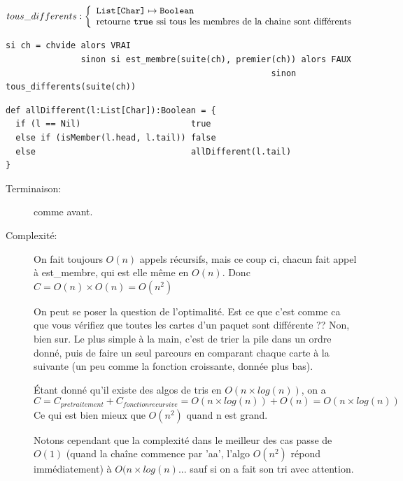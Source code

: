 \documentclass[10pt]{article}\usepackage[correction,nu]{esial}
\begin{document}
\begin{Question}
  $tous\_differents: \left\{
    \begin{array}{l}
      \text{\texttt{List[Char]}}\mapsto \text{\texttt{Boolean}}\\
      \text{retourne \text{\texttt{true}} ssi tous les membres de la chaine sont différents}
    \end{array}\right.$  
\end{Question}
\begin{Reponse}
  \begin{Verbatim}[label=tous\_differents(ch)]
si ch = chvide alors VRAI
               sinon si est_membre(suite(ch), premier(ch)) alors FAUX
                                                     sinon tous_differents(suite(ch))    
  \end{Verbatim}
  \begin{Verbatim}
def allDifferent(l:List[Char]):Boolean = {
  if (l == Nil)                      true
  else if (isMember(l.head, l.tail)) false
  else                               allDifferent(l.tail)
}    
  \end{Verbatim}
  \begin{description}
  \item[Terminaison:] comme avant.
  \item[Complexité:] On fait toujours $O(n)$ appels récursifs, mais ce coup ci,
    chacun fait appel à est\_membre, qui est elle même en $O(n)$. Donc $C =
    O(n)\times O(n) = O(n^2)$

    On peut se poser la question de l'optimalité. Est ce que c'est comme ca que
    vous vérifiez que toutes les cartes d'un paquet sont différente ?? Non,
    bien sur. Le plus simple à la main, c'est de trier la pile dans un ordre
    donné, puis de faire un seul parcours en comparant chaque carte à la
    suivante (un peu comme la fonction croissante, donnée plus bas).

    Étant donné qu'il existe des algos de tris en $O(n\times log(n))$, on a
    $$C = C_{pretraitement}+C_{fonction recursive}= O(n\times log(n)) + O(n) =
    O(n\times log(n))$$ Ce qui est bien mieux que $O(n^2)$ quand n est grand.

    Notons cependant que la complexité dans le meilleur des cas passe de $O(1)$
    (quand la chaîne commence par 'aa', l'algo $O(n^2)$ répond immédiatement) à
    $O(n\times log(n)$... sauf si on a fait son tri avec attention.
  \end{description}
\end{Reponse}
\end{document}

